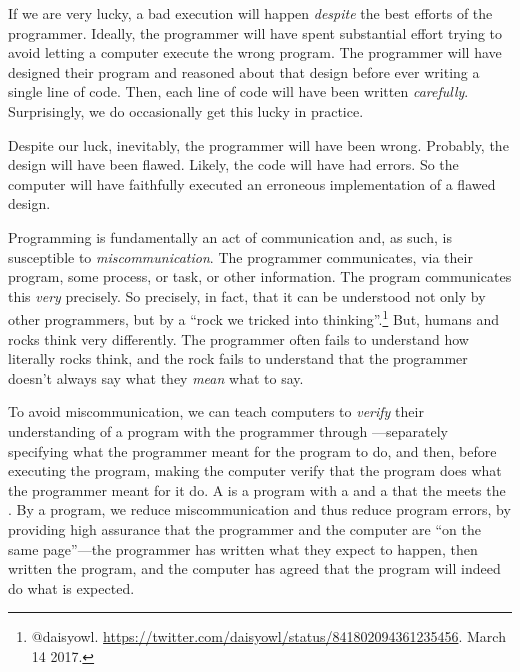 If we are very lucky, a bad execution will happen \emph{despite} the best
efforts of the programmer.
Ideally, the programmer will have spent substantial effort trying to avoid
letting a computer execute the wrong program.
The programmer will have designed their program and reasoned about that design
before ever writing a single line of code.
Then, each line of code will have been written \emph{carefully}.
Surprisingly, we do occasionally get this lucky in practice.

Despite our luck, inevitably, the programmer will have been wrong.
Probably, the design will have been flawed.
Likely, the code will have had errors.
So the computer will have faithfully executed an erroneous implementation of a
flawed design.

Programming is fundamentally an act of communication and, as such, is
susceptible to \emph{miscommunication}.
The programmer communicates, via their program, some process, or task, or other
information.
The program communicates this \emph{very} precisely.
So precisely, in fact, that it can be understood not only by other programmers,
but by a ``rock we tricked into thinking''.\footnote{@daisyowl.
  \url{https://twitter.com/daisyowl/status/841802094361235456}. March 14 2017.}
But, humans and rocks think very differently.
The programmer often fails to understand how literally rocks think, and the rock
fails to understand that the programmer doesn't always say what they \emph{mean}
what to say.

To avoid miscommunication, we can teach computers to \emph{verify} their
understanding of a program with the programmer through
%
---separately specifying what the programmer meant for the
program to do, and then, before executing the program, making the computer
verify that the program does what the programmer meant for it do.
A  is a
program  with a  and a 
that the  meets the .
By  a program, we reduce miscommunication and
thus reduce program errors, by providing high assurance that the programmer and
the computer are ``on the same page''---the programmer has written what they
expect to happen, then written the program, and the computer has agreed that the
program will indeed do what is expected.

